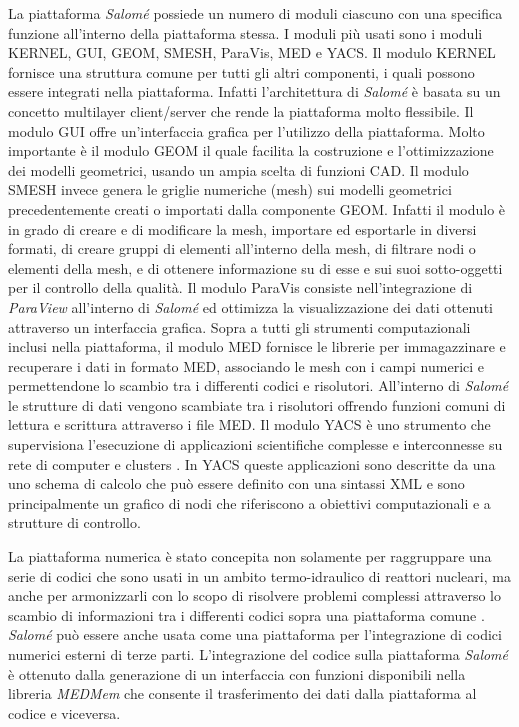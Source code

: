 La piattaforma \textit{Salom\'e} possiede un numero di moduli ciascuno con una 
specifica funzione all'interno della piattaforma stessa. I moduli pi\`u
usati sono i moduli KERNEL, GUI, GEOM, SMESH,
ParaVis, MED e YACS.
Il modulo KERNEL fornisce una struttura comune per tutti gli altri 
componenti, i 
quali possono essere integrati nella piattaforma. Infatti l'architettura di 
\textit{Salom\'e} è basata su un concetto multilayer client/server che rende la piattaforma molto 
flessibile.
Il modulo GUI offre un'interfaccia grafica per l'utilizzo della 
piattaforma.
Molto importante è il modulo GEOM il quale facilita la costruzione e 
l'ottimizzazione dei modelli geometrici, usando un ampia scelta di funzioni CAD.
Il modulo SMESH invece genera le griglie numeriche (mesh) sui modelli 
geometrici 
precedentemente creati o importati dalla componente GEOM. Infatti il 
modulo è in 
grado di creare e di modificare la mesh, importare ed esportarle in 
diversi formati, di creare gruppi di elementi all'interno della mesh, di 
filtrare nodi o elementi della mesh, e di ottenere informazione su di esse e 
sui 
suoi sotto-oggetti per il controllo della qualità.
Il modulo ParaVis consiste nell'integrazione di \textit{ParaView} 
all'interno di \textit{Salom\'e} ed 
ottimizza la visualizzazione dei dati ottenuti attraverso un interfaccia 
grafica. 
Sopra a tutti gli strumenti computazionali inclusi nella piattaforma, il modulo 
MED fornisce le librerie per immagazzinare e recuperare i dati in 
formato MED, 
associando le mesh con i campi numerici e permettendone lo scambio tra i 
differenti codici e risolutori. All'interno di \textit{Salom\'e} le 
strutture di dati vengono 
scambiate tra i risolutori offrendo funzioni comuni di lettura e scrittura 
attraverso i file MED.
Il modulo YACS è uno strumento che supervisiona l'esecuzione 
di applicazioni 
scientifiche complesse e interconnesse su rete di computer e clusters \cite{yacss}. In 
YACS 
queste applicazioni sono descritte da una uno schema di calcolo che può essere 
definito con una sintassi XML e sono principalmente un grafico di nodi che 
riferiscono a obiettivi computazionali e a strutture di controllo. 

La piattaforma numerica è stato concepita non solamente per raggruppare una 
serie di codici che sono usati in un ambito termo-idraulico di reattori 
nucleari, 
ma anche per armonizzarli con lo scopo di risolvere problemi complessi 
attraverso lo scambio di informazioni tra i differenti codici sopra una 
piattaforma comune \cite{ribes2007salome}.
\textit{Salom\'e} può essere anche usata come una piattaforma per l'integrazione 
di codici 
numerici esterni di terze parti.
L'integrazione del codice sulla piattaforma \textit{Salom\'e} è ottenuto dalla 
generazione 
di un interfaccia con funzioni disponibili nella libreria \textit{MEDMem} che 
consente il 
trasferimento dei dati dalla piattaforma al codice e viceversa.


